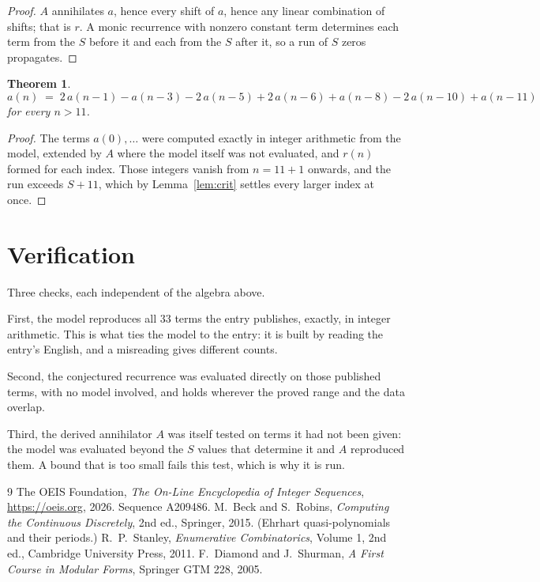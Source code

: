 \documentclass[11pt,a4paper]{article}
\theoremstyle{plain}
\newtheorem{theorem}{Theorem}
\theoremstyle{definition}
\begin{document}
\begin{proof}
$A$ annihilates $a$, hence every shift of $a$, hence any linear combination of shifts; that is
$r$. A monic recurrence with nonzero constant term determines each term from the $S$ before it
and each from the $S$ after it, so a run of $S$ zeros propagates.
\end{proof}

\begin{theorem}
\[
a(n)\;=\;2\,a(n-1) - a(n-3) - 2\,a(n-5) + 2\,a(n-6) + a(n-8) - 2\,a(n-10) + a(n-11)
\]
for every $n>11$.
\end{theorem}

\begin{proof}
The terms $a(0),\dots$ were computed exactly in integer arithmetic from the model, extended by
$A$ where the model itself was not evaluated, and $r(n)$ formed for each index. Those integers
vanish from $n=11+1$ onwards, and the run exceeds $S+11$, which by
Lemma~\ref{lem:crit} settles every larger index at once.
\end{proof}

\section{Verification}

Three checks, each independent of the algebra above.

First, the model reproduces all $33$ terms the entry publishes, exactly, in integer
arithmetic. This is what ties the model to the entry: it is built by reading the entry's
English, and a misreading gives different counts.

Second, the conjectured recurrence was evaluated directly on those published terms, with no
model involved, and holds wherever the proved range and the data overlap.

Third, the derived annihilator $A$ was itself tested on terms it had not been given: the model
was evaluated beyond the $S$ values that determine it and $A$ reproduced them. A bound that is
too small fails this test, which is why it is run.

\begin{thebibliography}{9}
 The OEIS Foundation, \emph{The On-Line Encyclopedia of Integer
Sequences}, \url{https://oeis.org}, 2026. Sequence A209486.
 M.~Beck and S.~Robins, \emph{Computing the Continuous Discretely},
2nd ed., Springer, 2015. (Ehrhart quasi-polynomials and their periods.)
 R.~P.~Stanley, \emph{Enumerative Combinatorics}, Volume 1, 2nd ed.,
Cambridge University Press, 2011.
 F.~Diamond and J.~Shurman, \emph{A First Course in Modular Forms},
Springer GTM 228, 2005.
\end{thebibliography}
\end{document}
